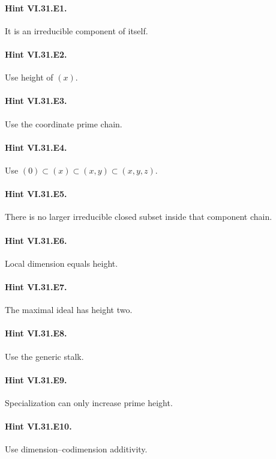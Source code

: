 \paragraph{Hint VI.31.E1.} It is an irreducible component of itself.

\paragraph{Hint VI.31.E2.} Use height of $(x)$.

\paragraph{Hint VI.31.E3.} Use the coordinate prime chain.

\paragraph{Hint VI.31.E4.} Use $(0)\subset(x)\subset(x,y)\subset(x,y,z)$.

\paragraph{Hint VI.31.E5.} There is no larger irreducible closed subset inside that component chain.

\paragraph{Hint VI.31.E6.} Local dimension equals height.

\paragraph{Hint VI.31.E7.} The maximal ideal has height two.

\paragraph{Hint VI.31.E8.} Use the generic stalk.

\paragraph{Hint VI.31.E9.} Specialization can only increase prime height.

\paragraph{Hint VI.31.E10.} Use dimension--codimension additivity.

